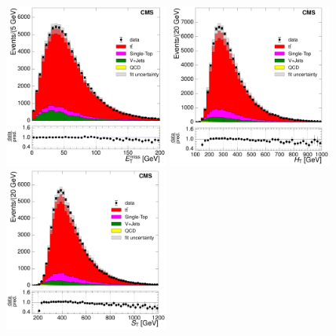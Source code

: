 \begin{figure}[hbtp]
    \centering
     \includegraphics[width=0.48\textwidth]{Chapters/04_Analysis/04b_XSections/images/control_plots/after_fit/8TeV/MuPlusJets_patType1CorrectedPFMet_2orMoreBtags_with_ratio.pdf}\hfill    
     \includegraphics[width=0.48\textwidth]{Chapters/04_Analysis/04b_XSections/images/control_plots/after_fit/8TeV/MuPlusJets_HT_2orMoreBtags_with_ratio.pdf}\\                            
     \includegraphics[width=0.48\textwidth]{Chapters/04_Analysis/04b_XSections/images/control_plots/after_fit/8TeV/MuPlusJets_patType1CorrectedPFMet_ST_2orMoreBtags_with_ratio.pdf}\hfill 

\end{figure}
